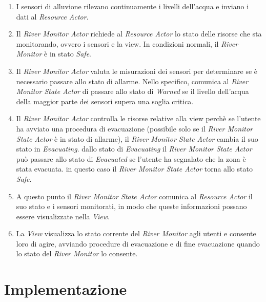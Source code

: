 \documentclass[12pt]{article}
\begin{document}
\begin{enumerate}
    \item I sensori di alluvione rilevano continuamente i livelli dell'acqua e inviano i dati al \textit{Resource Actor}.

    \item Il \textit{River Monitor Actor} richiede al \textit{Resource Actor} lo stato delle risorse che sta monitorando, ovvero i sensori e la view. In condizioni normali, il \textit{River Monitor} è in stato \textit{Safe}.

    \item Il \textit{River Monitor Actor} valuta le misurazioni dei sensori per determinare se è necessario passare allo stato di allarme. Nello specifico, comunica al \textit{River Monitor State Actor} di passare allo stato di \textit{Warned} se il livello dell'acqua della maggior parte dei sensori supera una soglia critica.

    \item Il \textit{River Monitor Actor} controlla le risorse relative alla view perchè se l'utente ha avviato una procedura di evacuazione (possibile solo se il \textit{River Monitor State Actor} è in stato di allarme), il \textit{River Monitor State Actor} cambia il suo stato in \textit{Evacuating}. dallo stato di \textit{Evacuating} il \textit{River Monitor State Actor} può passare allo stato di \textit{Evacuated} se l'utente ha segnalato che la zona è stata evacuata. in questo caso il \textit{River Monitor State Actor} torna allo stato \textit{Safe}.

    \item A questo punto il \textit{River Monitor State Actor} comunica al \textit{Resource Actor} il suo stato e i sensori monitorati, in modo che queste informazioni possano essere visualizzate nella \textit{View}.

    \item La \textit{View} visualizza lo stato corrente del \textit{River Monitor} agli utenti e consente loro di agire, avviando procedure di evacuazione e di fine evacuazione quando lo stato del \textit{River Monitor} lo consente.
\end{enumerate}

\newpage


\section{Implementazione}\label{sec:implementazione}
\end{document}
